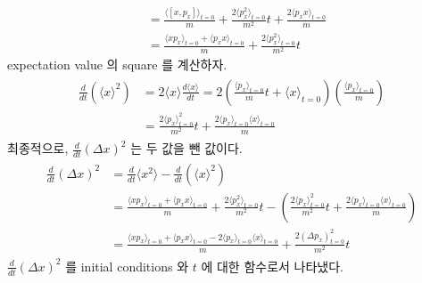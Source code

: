 \documentclass[floatfix,nofootinbib,superscriptaddress,fleqn]{revtex4}
\begin{document}
\begin{itemize}
\begin{align}
    &=\frac{\langle[x,p_x]\rangle_{t=0}}{m}
    +\frac{2\langle p_x^2\rangle_{t=0}}{m^2}t
    +\frac{2\langle p_xx\rangle_{t=0}}{m} \\
    &=\frac{\langle xp_x\rangle_{t=0}+\langle p_xx\rangle_{t=0}}{m}
    +\frac{2\langle p_x^2\rangle_{t=0}}{m^2}t
  \end{align}
expectation value 의 square 를 계산하자.
  \begin{align}
    \begin{split}
      \frac{d}{dt}\left(\langle x \rangle^2\right) 
      &=2\langle x\rangle\frac{d\langle x\rangle}{dt}
      =2\left(\frac{\langle p_x\rangle_{t=0}}{m}t
      +\langle x\rangle_{t=0}\right)\left(
        \frac{\langle p_x\rangle_{t=0}}{m}\right)  \\
      &=\frac{2\langle p_x\rangle_{t=0}^2}{m^2}t
      +\frac{2\langle p_x\rangle_{t=0}\langle x\rangle_{t=0}}{m}
    \end{split}
  \end{align}
 최종적으로, $\frac{d}{dt}(\Delta x)^2 $ 는 두 값을 뺀 값이다.
  \begin{align}
    \begin{split}
      \frac{d}{dt}(\Delta x)^2 
      &=\frac{d}{dt}\langle x^2 \rangle
      -\frac{d}{dt}\left(\langle x \rangle^2\right) \\
      &=\frac{\langle xp_x\rangle_{t=0}+\langle p_xx\rangle_{t=0}}{m}
      +\frac{2\langle p_x^2\rangle_{t=0}}{m^2}t
      -\left(\frac{2\langle p_x\rangle_{t=0}^2}{m^2}t
      +\frac{2\langle p_x\rangle_{t=0}\langle x\rangle_{t=0}}{m}
      \right) \\
      &=\frac{\langle xp_x\rangle_{t=0}+\langle p_xx\rangle_{t=0}
      -2\langle p_x\rangle_{t=0}\langle x\rangle_{t=0}}{m}
      +\frac{2\left(\Delta p_x\right)^2_{t=0}}{m^2}t
    \end{split}
  \end{align}
  $\frac{d}{dt}(\Delta x)^2 $ 를 initial conditions 와 
  $t$ 에 대한 함수로서 나타냈다.
\end{itemize} 
\newpage
\end{document}
